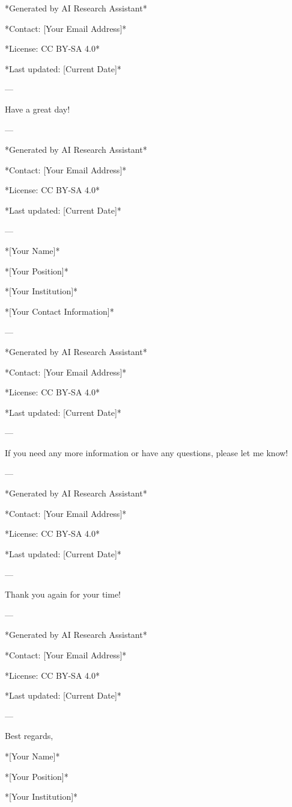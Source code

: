 *Generated by AI Research Assistant* 

*Contact: [Your Email Address]* 

*License: CC BY-SA 4.0* 

*Last updated: [Current Date]* 

--- 

Have a great day! 

--- 

*Generated by AI Research Assistant* 

*Contact: [Your Email Address]* 

*License: CC BY-SA 4.0* 

*Last updated: [Current Date]* 

--- 

*[Your Name]* 

*[Your Position]* 

*[Your Institution]* 

*[Your Contact Information]* 

--- 

*Generated by AI Research Assistant* 

*Contact: [Your Email Address]* 

*License: CC BY-SA 4.0* 

*Last updated: [Current Date]* 

--- 

If you need any more information or have any questions, please let me know! 

--- 

*Generated by AI Research Assistant* 

*Contact: [Your Email Address]* 

*License: CC BY-SA 4.0* 

*Last updated: [Current Date]* 

--- 

Thank you again for your time! 

--- 

*Generated by AI Research Assistant* 

*Contact: [Your Email Address]* 

*License: CC BY-SA 4.0* 

*Last updated: [Current Date]* 

--- 

Best regards, 

*[Your Name]* 

*[Your Position]* 

*[Your Institution]* 

